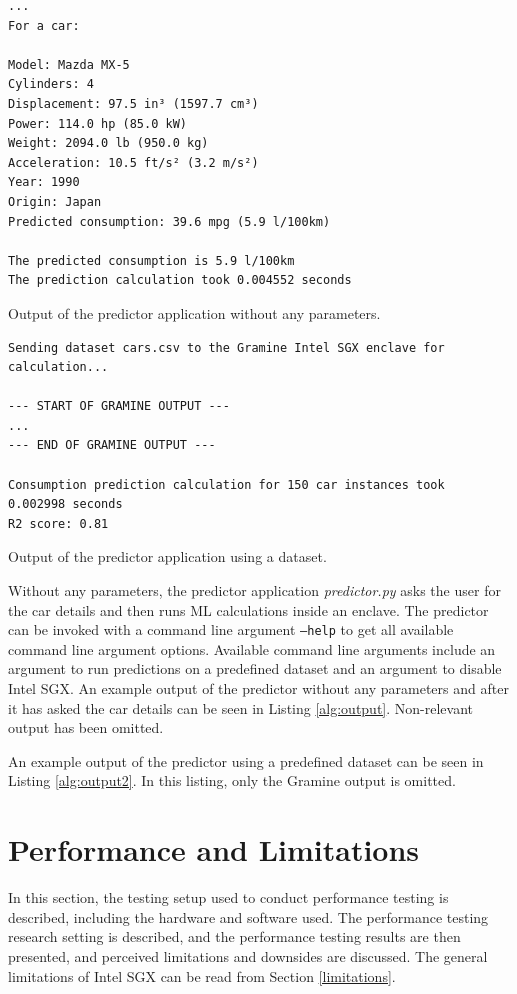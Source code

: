 \begin{algorithm}
\begin{verbatim}
...
For a car:

Model: Mazda MX-5
Cylinders: 4
Displacement: 97.5 in³ (1597.7 cm³)
Power: 114.0 hp (85.0 kW)
Weight: 2094.0 lb (950.0 kg)
Acceleration: 10.5 ft/s² (3.2 m/s²)
Year: 1990
Origin: Japan
Predicted consumption: 39.6 mpg (5.9 l/100km)

The predicted consumption is 5.9 l/100km
The prediction calculation took 0.004552 seconds
\end{verbatim}
\caption{Output of the predictor application without any parameters.\label{alg:output}}
\end{algorithm}

\begin{algorithm}
\begin{verbatim}
Sending dataset cars.csv to the Gramine Intel SGX enclave for
calculation...

--- START OF GRAMINE OUTPUT ---
...
--- END OF GRAMINE OUTPUT ---

Consumption prediction calculation for 150 car instances took
0.002998 seconds
R2 score: 0.81
\end{verbatim}
\caption{Output of the predictor application using a dataset.\label{alg:output2}}
\end{algorithm}

Without any parameters, the predictor application \textit{predictor.py} asks the user for the car details and then runs ML calculations inside an enclave. The predictor can be invoked with a command line argument \texttt{--help} to get all available command line argument options. Available command line arguments include an argument to run predictions on a predefined dataset and an argument to disable Intel SGX. An example output of the predictor without any parameters and after it has asked the car details can be seen in Listing \ref{alg:output}. Non-relevant output has been omitted.

An example output of the predictor using a predefined dataset can be seen in Listing \ref{alg:output2}. In this listing, only the Gramine output is omitted.

\section{Performance and Limitations} \label{perfandlimitations}

In this section, the testing setup used to conduct performance testing is described, including the hardware and software used. The performance testing research setting is described, and the performance testing results are then presented, and perceived limitations and downsides are discussed. The general limitations of Intel SGX can be read from Section \ref{limitations}.

